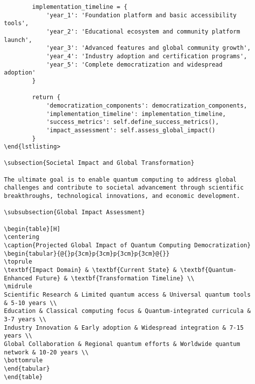 \documentclass[12pt,a4paper]{report}
\begin{document}
\begin{lstlisting}
        implementation_timeline = {
            'year_1': 'Foundation platform and basic accessibility tools',
            'year_2': 'Educational ecosystem and community platform launch',
            'year_3': 'Advanced features and global community growth',
            'year_4': 'Industry adoption and certification programs',
            'year_5': 'Complete democratization and widespread adoption'
        }

        return {
            'democratization_components': democratization_components,
            'implementation_timeline': implementation_timeline,
            'success_metrics': self.define_success_metrics(),
            'impact_assessment': self.assess_global_impact()
        }
\end{lstlisting>

\subsection{Societal Impact and Global Transformation}

The ultimate goal is to enable quantum computing to address global challenges and contribute to societal advancement through scientific breakthroughs, technological innovations, and economic development.

\subsubsection{Global Impact Assessment}

\begin{table}[H]
\centering
\caption{Projected Global Impact of Quantum Computing Democratization}
\begin{tabular}{@{}p{3cm}p{3cm}p{3cm}p{3cm}@{}}
\toprule
\textbf{Impact Domain} & \textbf{Current State} & \textbf{Quantum-Enhanced Future} & \textbf{Transformation Timeline} \\
\midrule
Scientific Research & Limited quantum access & Universal quantum tools & 5-10 years \\
Education & Classical computing focus & Quantum-integrated curricula & 3-7 years \\
Industry Innovation & Early adoption & Widespread integration & 7-15 years \\
Global Collaboration & Regional quantum efforts & Worldwide quantum network & 10-20 years \\
\bottomrule
\end{tabular}
\end{table}


\end{lstlisting}
\end{document}

